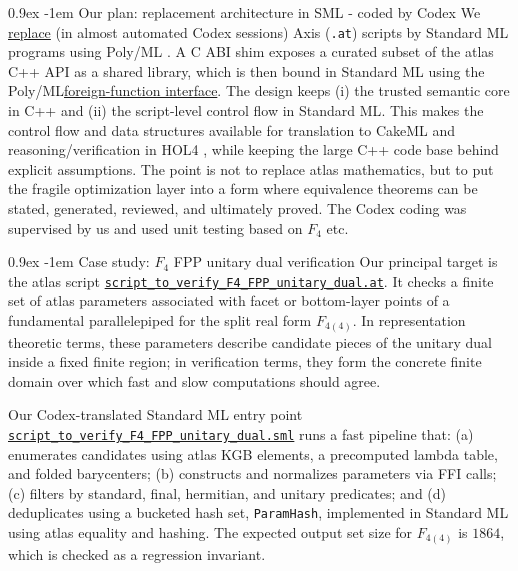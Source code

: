 \documentclass{easychair}
\makeatletter
\def\atlas{\textsf{atlas}\xspace}
\def\axis{\textsf{Axis}\xspace}
\def\polyml{\textsf{Poly/ML}\xspace}
\def\sml{\textsf{Standard ML}\xspace}
\def\holfour{\textsf{HOL4}\xspace}
\def\cakeml{\textsf{CakeML}\xspace}
\renewcommand\paragraph{\@startsection{paragraph}{4}{\z@}%
  {0.9ex}   %
  {-1em}    %
  {\normalfont\normalsize\bfseries}}
\makeatother
\begin{document}
\paragraph{Our plan: replacement architecture in SML - coded by Codex}
We \href{https://github.com/JUrban/atlasofliegroups_sml1/tree/to_ht_branch_alt}{replace} (in almost automated Codex sessions) \axis{} (\texttt{.at}) scripts by \sml programs using \polyml{} \cite{PolyML}.  A C
ABI shim exposes a curated subset of the \atlas{} C++ API as a shared library,
which is then bound in \sml using the \polyml \href{https://github.com/JUrban/atlasofliegroups_sml1/blob/to_ht_branch_alt/atlas-scripts-sml/ffi}{foreign-function interface}.  The
design keeps (i) the trusted semantic core in C++ and (ii) the script-level
control flow in \sml.  This makes the control flow and data structures
available for translation to \cakeml{} \cite{CakeML} and reasoning/verification in \holfour{} \cite{HOL4}, while keeping
the large C++ code base behind explicit assumptions.
%
The point is not to replace \atlas{} mathematics, but to
put the fragile optimization layer into a form where equivalence theorems can
be stated, generated, reviewed, and ultimately proved. The Codex coding was supervised by us and used unit testing based on $F_4$ etc.

\paragraph{Case study: $F_4$ FPP unitary dual verification}
Our principal target is the \atlas{} script
\href{https://github.com/JUrban/atlasofliegroups_sml1/blob/to_ht_branch_alt/atlas-scripts/script_to_verify_F4_FPP_unitary_dual.at}{\texttt{script\_to\_verify\_F4\_FPP\_unitary\_dual.at}}.  It checks a finite set
of \atlas{} parameters associated with facet or bottom-layer points of a
fundamental parallelepiped for the split real form $F_{4(4)}$.  In representation
theoretic terms, these parameters describe candidate pieces of the unitary dual
inside a fixed finite region; in verification terms, they form the concrete
finite domain over which fast and slow computations should agree.

Our Codex-translated \sml entry point
\href{https://github.com/JUrban/atlasofliegroups_sml1/blob/to_ht_branch_alt/atlas-scripts-sml/script_to_verify_F4_FPP_unitary_dual.sml}{\texttt{script\_to\_verify\_F4\_FPP\_unitary\_dual.sml}} runs a fast pipeline
that: (a) enumerates candidates using \atlas{} KGB elements, a precomputed
lambda table, and folded barycenters; (b) constructs and normalizes parameters
via FFI calls; (c) filters by standard, final, hermitian, and unitary predicates;
and (d) deduplicates using a bucketed hash set, \texttt{ParamHash}, implemented
in \sml using \atlas{} equality and hashing.  The expected output set size for
\(F_{4(4)}\) is \(1864\), which is checked as a regression invariant.
\end{document}
